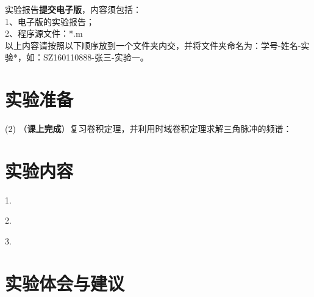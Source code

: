 \documentclass{sasreport}
\begin{document}
\maketitle

\noindent 实验报告\textbf{提交电子版}，内容须包括：\\
1、电子版的实验报告；\\
2、程序源文件：*.m\\
以上内容请按照以下顺序放到一个文件夹内交，并将文件夹命名为：学号-姓名-实验*，如：SZ160110888-张三-实验一。

\section{实验准备}
 (2) （\textbf{课上完成}）复习卷积定理，并利用时域卷积定理求解三角脉冲的频谱：

\section{实验内容}
1.

2.

3.

\section{实验体会与建议}
\end{document}
